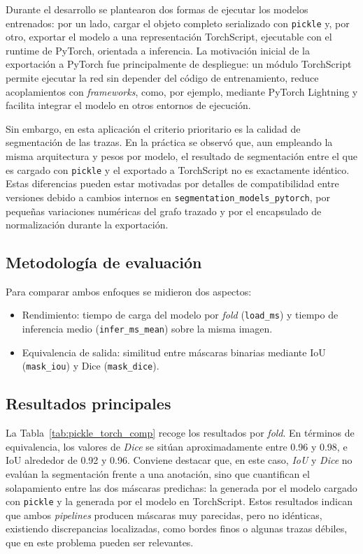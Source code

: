 Durante el desarrollo se plantearon dos formas de ejecutar los modelos entrenados: por un lado, cargar el objeto completo serializado con \texttt{pickle} y, por otro, exportar el modelo a una representación TorchScript, ejecutable con el runtime de PyTorch, orientada a inferencia. La motivación inicial de la exportación a PyTorch fue principalmente de despliegue: un módulo TorchScript permite ejecutar la red sin depender del código de entrenamiento, reduce acoplamientos con \textit{frameworks}, como, por ejemplo, mediante PyTorch Lightning y facilita integrar el modelo en otros entornos de ejecución.

Sin embargo, en esta aplicación el criterio prioritario es la calidad de segmentación de las trazas. En la práctica se observó que, aun empleando la misma arquitectura y pesos por modelo, el resultado de segmentación entre el que es cargado con \texttt{pickle} y el exportado a TorchScript no es exactamente idéntico. Estas diferencias pueden estar motivadas por detalles de compatibilidad entre versiones debido a cambios internos en \texttt{segmentation\_models\_pytorch}, por pequeñas variaciones numéricas del grafo trazado y por el encapsulado de normalización durante la exportación.

\subsection{Metodología de evaluación}
Para comparar ambos enfoques se midieron dos aspectos:
\begin{itemize}
	\item Rendimiento: tiempo de carga del modelo por \textit{fold} (\texttt{load\_ms}) y tiempo de inferencia medio (\texttt{infer\_ms\_mean}) sobre la misma imagen.
	\item Equivalencia de salida: similitud entre máscaras binarias mediante IoU (\texttt{mask\_iou}) y Dice (\texttt{mask\_dice}).
\end{itemize}

\subsection{Resultados principales}
La Tabla~\ref{tab:pickle_torch_comp} recoge los resultados por \textit{fold}. En términos de equivalencia, los valores de \textit{Dice} se sitúan aproximadamente entre 0.96 y 0.98, e IoU alrededor de 0.92 y 0.96. Conviene destacar que, en este caso, \textit{IoU} y \textit{Dice} no evalúan la segmentación frente a una anotación, sino que cuantifican el solapamiento entre las dos máscaras predichas: la generada por el modelo cargado con \texttt{pickle} y la generada por el modelo en TorchScript. Estos resultados indican que ambos \textit{pipelines} producen máscaras muy parecidas, pero no idénticas, existiendo discrepancias localizadas, como bordes finos o algunas trazas débiles, que en este problema pueden ser relevantes.

